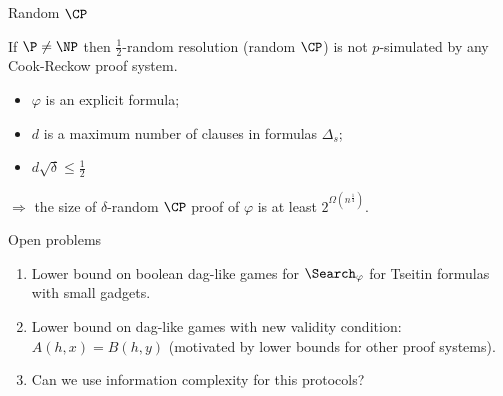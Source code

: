 \begin{frame}{Random $\CP$}

    \begin{theorem}
        If $\P \neq \NP$ then $\frac{1}{2}$-random resolution (random $\CP$) is not $p$-simulated by any Cook-Reckow proof
        system.
    \end{theorem}

    \pause

    \begin{theorem}
        \begin{itemize}
            \item $\varphi$ is an explicit formula;
            \item $d$ is a maximum number of clauses in formulas $\Delta_s$;
            \item $d \sqrt{\delta} \le \frac{1}{2}$
        \end{itemize}
        $\Rightarrow$ the size of $\delta$-random $\CP$ proof of $\varphi$ is at least $2^{\Omega(n^{\frac{1}{4}})}$.
    \end{theorem}
\end{frame}

\begin{frame}{Open problems}
    \begin{enumerate}
            
        \pause
        \item Lower bound on boolean dag-like games for $\Search_{\varphi}$ for Tseitin formulas with small
            gadgets.
        \pause
        \item Lower bound on dag-like games with new validity condition: $A(h, x) = B(h, y)$ (motivated
            by lower bounds for other proof systems).
        \pause
        \item Can we use information complexity for this protocols?
    \end{enumerate}
\end{frame}